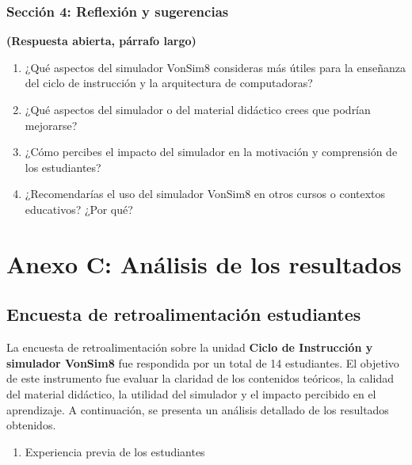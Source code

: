 \documentclass[12pt,oneside]{templates/unerthesis}
\providecommand{\tightlist}{%
  \setlength{\itemsep}{0pt}\setlength{\parskip}{0pt}}
\begin{document}
\hypertarget{secciuxf3n-4-reflexiuxf3n-y-sugerencias-1}{%
\subsubsection{Sección 4: Reflexión y sugerencias}\label{secciuxf3n-4-reflexiuxf3n-y-sugerencias-1}}

\textbf{(Respuesta abierta, párrafo largo)}

\begin{enumerate}
\def\labelenumi{\arabic{enumi}.}
\setcounter{enumi}{14}
\item
  ¿Qué aspectos del simulador VonSim8 consideras más útiles para la enseñanza del ciclo de instrucción y la arquitectura de computadoras?
\item
  ¿Qué aspectos del simulador o del material didáctico crees que podrían mejorarse?
\item
  ¿Cómo percibes el impacto del simulador en la motivación y comprensión de los estudiantes?
\item
  ¿Recomendarías el uso del simulador VonSim8 en otros cursos o contextos educativos? ¿Por qué?
\end{enumerate}

\hypertarget{anexoC}{%
\section{Anexo C: Análisis de los resultados}\label{anexoC}}

\hypertarget{encuesta-de-retroalimentaciuxf3n-estudiantes}{%
\subsection{Encuesta de retroalimentación estudiantes}\label{encuesta-de-retroalimentaciuxf3n-estudiantes}}

La encuesta de retroalimentación sobre la unidad \textbf{Ciclo de Instrucción y simulador VonSim8} fue respondida por un total de 14 estudiantes. El objetivo de este instrumento fue evaluar la claridad de los contenidos teóricos, la calidad del material didáctico, la utilidad del simulador y el impacto percibido en el aprendizaje. A continuación, se presenta un análisis detallado de los resultados obtenidos.

\begin{enumerate}
\def\labelenumi{\arabic{enumi}.}
\tightlist
\item
  Experiencia previa de los estudiantes
\end{enumerate}
\end{document}
